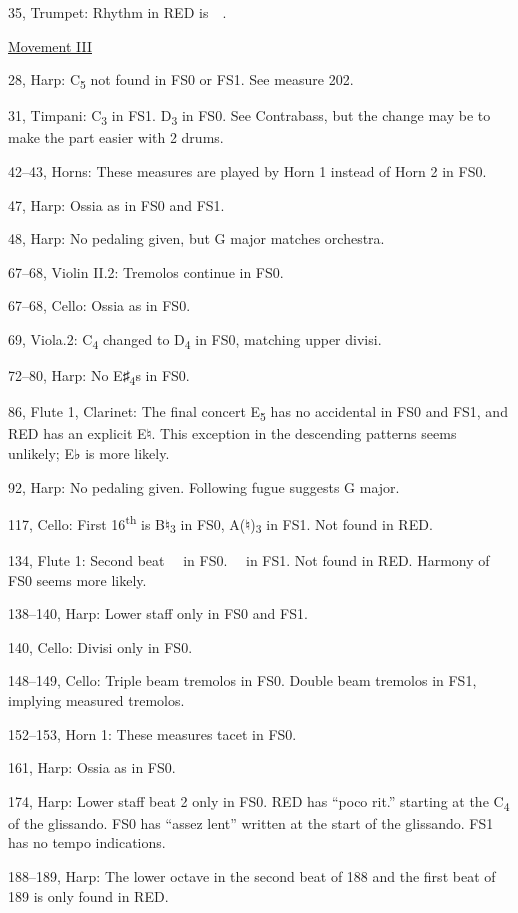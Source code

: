 \documentclass[twoside]{article}
\begin{document}
\begin{hangparas}{15pt}{1}
\begin{multicols}{2}
35, Trumpet: Rhythm in RED is \SechBr \Vier\,\Pu\ .

\underline{Movement III}

28, Harp: C\textsubscript{5} not found in FS0 or FS1. See measure 202.

31, Timpani: C\textsubscript{3} in FS1. D\textsubscript{3} in FS0. See Contrabass, but the change may be to make the part easier with 2 drums.

42--43, Horns: These measures are played by Horn 1 instead of Horn 2 in FS0.

47, Harp: Ossia as in FS0 and FS1.

48, Harp: No pedaling given, but G major matches orchestra. 

67--68, Violin II.2: Tremolos continue in FS0.

67--68, Cello: Ossia as in FS0.

69, Viola.2: C\textsubscript{4} changed to D\textsubscript{4} in FS0, matching upper divisi.

72--80, Harp: No E♯\textsubscript{4}s in FS0.

86, Flute 1, Clarinet: The final concert E\textsubscript{5} has no accidental in FS0 and FS1, and RED has an explicit E♮. This exception in the descending patterns seems unlikely; E♭ is more likely. 

92, Harp: No pedaling given. Following fugue suggests G major.

117, Cello: First 16\textsuperscript{th} is B♮\textsubscript{3} in FS0, A(♮)\textsubscript{3} in FS1. Not found in RED. 

134, Flute 1: Second beat \SechBR \Vier \AchtBL\ \ in FS0. \AchtBR \Vier \SechBL\ \ in FS1. Not found in RED. Harmony of FS0 seems more likely.

138--140, Harp: Lower staff only in FS0 and FS1.

140, Cello: Divisi only in FS0.

148--149, Cello: Triple beam tremolos in FS0. Double beam tremolos in FS1, implying measured tremolos.

152--153, Horn 1: These measures tacet in FS0.

161, Harp: Ossia as in FS0.

174, Harp: Lower staff beat 2 only in FS0. RED has ``poco rit.'' starting at the C\textsubscript{4} of the glissando. FS0 has ``assez lent'' written at the start of the glissando. FS1 has no tempo indications.

188--189, Harp: The lower octave in the second beat of 188 and the first beat of 189 is only found in RED.


\end{multicols}
\end{hangparas}
\end{document}
